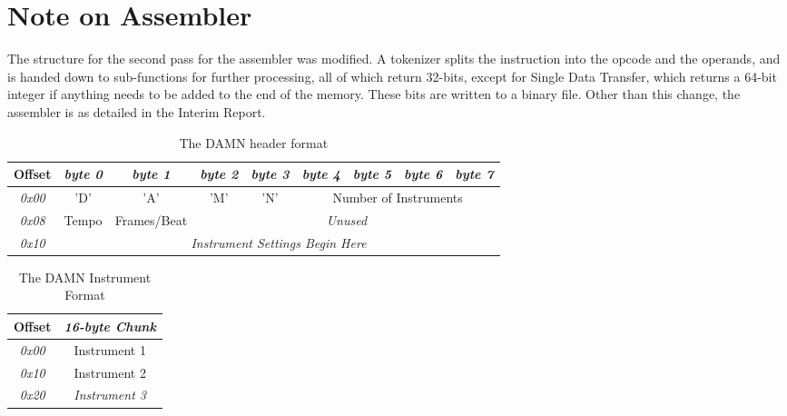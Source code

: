 \documentclass[11pt]{article}
\begin{document}
\section{Note on Assembler}
The structure for the second pass for the assembler was modified. A tokenizer splits the instruction into the opcode and the operands, and is handed down to sub-functions for further processing, all of which return 32-bits, except for Single Data Transfer, which returns a 64-bit integer if anything needs to be added to the end of the memory. These bits are written to a binary file. Other than this change, the assembler is as detailed in the Interim Report.

\pagebreak

\begin{table}[]
\centering
\caption{The DAMN header format}
\label{my-label}
\begin{tabular}{|c|c|c|c|c|c|c|c|c|}
\hline
\textbf{Offset} & \textit{byte 0} & \textit{byte 1} & \textit{byte 2} & \textit{byte 3} & \textit{byte 4} & \textit{byte 5} & \textit{byte 6} & \textit{byte 7} \\ \hline
\textit{0x00}   & 'D'          & 'A'          & 'M'          & 'N'          & \multicolumn{4}{c|}{Number of Instruments}                \\ \hline
\textit{0x08}   & Tempo        & Frames/Beat  & \multicolumn{6}{c|}{\textit{Unused}}                                                    \\ \hline
\textit{0x10}   & \multicolumn{8}{c|}{\textit{Instrument Settings Begin Here}}                                                          \\ \hline
\end{tabular}
\end{table}

\begin{table}[]
\centering
\caption{The DAMN Instrument Format}
\label{my-label}
\begin{tabular}{|c|c|}
\hline
\textbf{Offset} & \textit{16-byte Chunk} \\ \hline
\textit{0x00}   & Instrument 1           \\ \hline
\textit{0x10}   & Instrument 2           \\ \hline
\textit{0x20}   & \textit{Instrument 3}  \\ \hline
\end{tabular}
\end{table}
\end{document}
